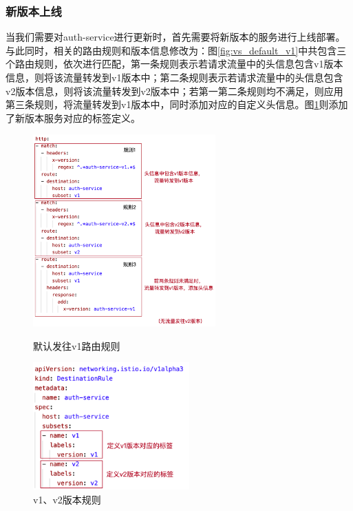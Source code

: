 \documentclass[12pt,a4paper]{article}
\theoremstyle{definition}
\begin{document}
\subsubsection{新版本上线}
当我们需要对auth-service进行更新时，首先需要将新版本的服务进行上线部署。与此同时，相关的路由规则和版本信息修改为：图\ref{fig:vs_default_v1}中共包含三个路由规则，依次进行匹配，第一条规则表示若请求流量中的头信息包含v1版本信息，则将该流量转发到v1版本中；第二条规则表示若请求流量中的头信息包含v2版本信息，则将该流量转发到v2版本中；若第一第二条规则均不满足，则应用第三条规则，将流量转发到v1版本中，同时添加对应的自定义头信息。图\ref{fig:dr_v1v2}则添加了新版本服务对应的标签定义。
\begin{figure}[htbp]
\centering
\begin{minipage}[t]{0.48\textwidth}
\centering
\centerline{\includegraphics[width=7cm]{vs_default_v1.png}}
\caption{默认发往v1路由规则}
\label{fig:vs_default_v1}
\end{minipage}
\begin{minipage}[t]{0.48\textwidth}
\centering
\centerline{\includegraphics[width=6cm]{dr_v1v2.png}}
\caption{v1、v2版本规则}
\label{fig:dr_v1v2}
\end{minipage}
\end{figure}
\end{document}
